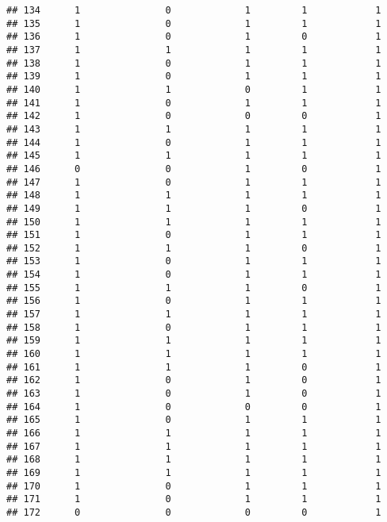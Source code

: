 \documentclass[]{article}
\begin{document}
\begin{verbatim}
## 134      1               0             1         1            1
## 135      1               0             1         1            1
## 136      1               0             1         0            1
## 137      1               1             1         1            1
## 138      1               0             1         1            1
## 139      1               0             1         1            1
## 140      1               1             0         1            1
## 141      1               0             1         1            1
## 142      1               0             0         0            1
## 143      1               1             1         1            1
## 144      1               0             1         1            1
## 145      1               1             1         1            1
## 146      0               0             1         0            1
## 147      1               0             1         1            1
## 148      1               1             1         1            1
## 149      1               1             1         0            1
## 150      1               1             1         1            1
## 151      1               0             1         1            1
## 152      1               1             1         0            1
## 153      1               0             1         1            1
## 154      1               0             1         1            1
## 155      1               1             1         0            1
## 156      1               0             1         1            1
## 157      1               1             1         1            1
## 158      1               0             1         1            1
## 159      1               1             1         1            1
## 160      1               1             1         1            1
## 161      1               1             1         0            1
## 162      1               0             1         0            1
## 163      1               0             1         0            1
## 164      1               0             0         0            1
## 165      1               0             1         1            1
## 166      1               1             1         1            1
## 167      1               1             1         1            1
## 168      1               1             1         1            1
## 169      1               1             1         1            1
## 170      1               0             1         1            1
## 171      1               0             1         1            1
## 172      0               0             0         0            1

\end{verbatim}
\end{document}
